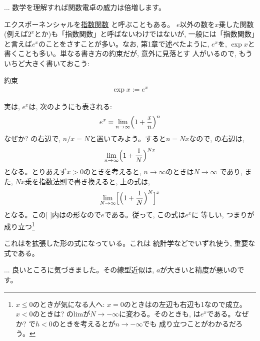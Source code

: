 \begin{faq}\small{
... 数学を理解すれば関数電卓の威力は倍増します。}\end{faq}

エクスポーネンシャルを\underline{指数関数} と呼ぶこともある。
$e$以外の数を$x$乗した関数(例えば$2^x$とか)も「指数関数」と呼ばないわけではないが, 
一般には「指数関数」と言えば$e^x$のことをさすことが多い。なお, 第1章で述べたように, 
$e^x$を, $\exp x$と書くことも多い。単なる書き方の約束だが, 意外に見落とす
人がいるので, もういちど大きく書いておこう:

\begin{itembox}{約束}
\begin{eqnarray}\exp x :=e^x\end{eqnarray}
\end{itembox}

実は, $e^x$は, 次のようにも表される:
\begin{eqnarray}
e^x=\lim_{n \to \infty} \Bigl( 1 + \frac{x}{n} \Bigr)^n\label{eq:func_e_def}
\end{eqnarray}
なぜか? の右辺で, $n/x=N$と置いてみよう。すると$n=Nx$なので, 
の右辺は, 
\begin{eqnarray}
\lim_{n \to \infty} \Bigl( 1 + \frac{1}{N} \Bigr)^{Nx}\label{eq:func_e_def00}
\end{eqnarray}
となる。とりあえず$x>0$のときを考えると, $n\rightarrow\infty$のときは$N\rightarrow\infty$
であり, また, $Nx$乗を指数法則で書き換えると, 上の式は, 
\begin{eqnarray}
\lim_{N \to \infty} \Bigl[\Bigl( 1 + \frac{1}{N} \Bigr)^N\Bigr]^x\label{eq:func_e_def01}
\end{eqnarray}
となる。この[ ]内はの形なので$e$である。従って, この式は$e^x$に
等しい, つまりが成り立つ\footnote{$x\leq0$のときが気になる人へ: 
$x=0$のときはの左辺も右辺も1なので成立。$x<0$のときは?
のlimが$N \to -\infty$に変わる。そのときも, 
は$e^x$である。なぜか? 
で$h<0$のときを考えるとが$n\rightarrow-\infty$でも
成り立つことがわかるだろう。}

これはを拡張した形の式になっている。これは
統計学などでいずれ使う, 重要な式である。\hv


\begin{faq}{\small{}
... 良いところに気づきました。その線型近似は, $a$が大きいと精度が悪いのです。}\end{faq}

